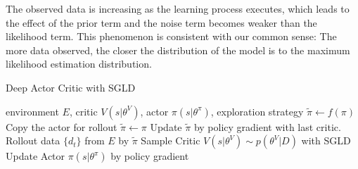 The observed data is increasing as the learning process executes, which leads to the effect of the prior term and the noise term becomes weaker than the likelihood term. This phenomenon is consistent with our common sense: The more data observed, the closer the distribution of the model is to the maximum likelihood estimation distribution.
\begin{algorithm}[htbp]
   \caption{Deep Actor Critic with SGLD}
   \label{alg:sgldac}
\begin{algorithmic}
    environment $E$, critic $V(s|\theta^V)$, actor $\pi(s|\theta^\pi)$, exploration strategy $\tilde\pi \leftarrow f(\pi)$
   \STATE Copy the actor for rollout $\tilde \pi\leftarrow \pi$
   \STATE Update $\tilde\pi$ by policy gradient with last critic.
   \ENDFOR
   \STATE Rollout data $\{d_t\}$ from $E$ by $\tilde\pi$
   \STATE Sample Critic $V(s|\theta^V) \sim p(\theta^V|D)$ with SGLD
   \STATE Update Actor $\pi(s|\theta^\pi)$ by policy gradient 
   \ENDFOR
   \ENDFOR
\end{algorithmic}
\end{algorithm}
